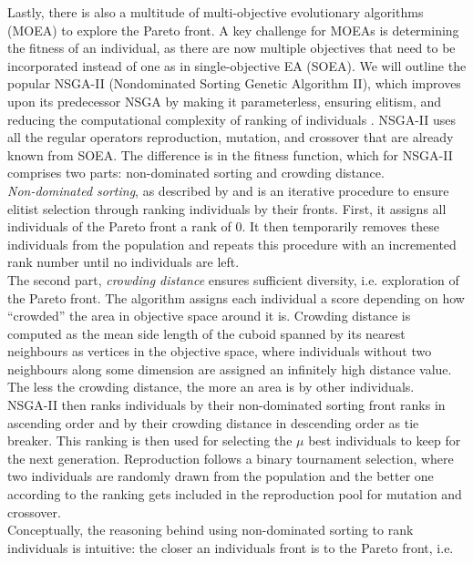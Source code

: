 \documentclass[twoside,11pt]{article}
\begin{document}
Lastly, there is also a multitude of multi-objective evolutionary algorithms (MOEA) to explore the Pareto front.
A key challenge for MOEAs is determining the fitness of an individual, as there are now multiple objectives that need to be incorporated instead of
one as in single-objective EA (SOEA).
We will outline the popular NSGA-II (Nondominated Sorting Genetic Algorithm II), which improves upon its predecessor NSGA \citep{NSGA} by making it
parameterless, ensuring elitism, and reducing the computational complexity of ranking of individuals \citep[p. 182]{NSGA_II}.
NSGA-II uses all the regular operators reproduction, mutation, and crossover that are already known from SOEA.
The difference is in the fitness function, which for NSGA-II comprises two parts: non-dominated sorting and crowding distance.
\\
\textit{Non-dominated sorting}, as described by \citet[p. 201]{genetic_algos} and \citet[pp. 183f]{NSGA_II} is an iterative procedure to ensure
elitist selection through ranking individuals by their fronts.
First, it assigns all individuals of the Pareto front a rank of 0. It then temporarily removes these individuals from the population and repeats
this procedure with an incremented rank number until no individuals are left.
\\
The second part, \textit{crowding distance} ensures sufficient diversity, i.e. exploration of the Pareto front.
The algorithm assigns each individual a score depending on how ``crowded'' the area in objective space around it is. Crowding distance is computed
as the mean side length of the cuboid spanned by its nearest neighbours as vertices in the objective space, where individuals without two neighbours
along some dimension are assigned an infinitely high distance value. The less the crowding distance, the more an area is by other individuals. \citep[p. 185]{NSGA_II}
\\
NSGA-II then ranks individuals by their non-dominated sorting front ranks in ascending order and by their crowding distance in descending order as tie breaker.
This ranking is then used for selecting the $\mu$ best individuals to keep for the next generation.
Reproduction follows a binary tournament selection, where two individuals are randomly drawn from the population and the better one according to the ranking gets
included in the reproduction pool for mutation and crossover.
\\
Conceptually, the reasoning behind using non-dominated sorting to rank individuals is intuitive: the closer an individuals front is to the Pareto front, i.e.
\end{document}
